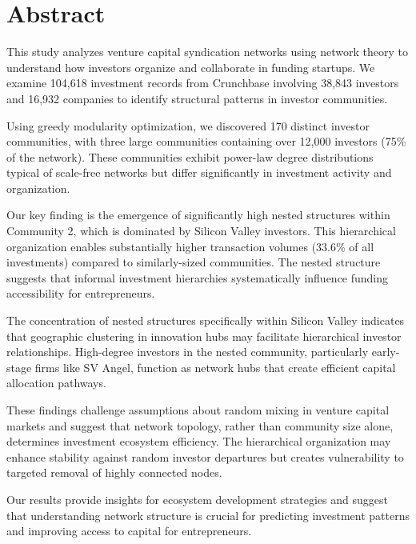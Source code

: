 \section*{Abstract}

This study analyzes venture capital syndication networks using network theory to understand how investors organize and collaborate in funding startups. We examine 104,618 investment records from Crunchbase involving 38,843 investors and 16,932 companies to identify structural patterns in investor communities.

Using greedy modularity optimization, we discovered 170 distinct investor communities, with three large communities containing over 12,000 investors (75\% of the network). These communities exhibit power-law degree distributions typical of scale-free networks but differ significantly in investment activity and organization.

Our key finding is the emergence of significantly high nested structures within Community 2, which is dominated by Silicon Valley investors. This hierarchical organization enables substantially higher transaction volumes (33.6\% of all investments) compared to similarly-sized communities. The nested structure suggests that informal investment hierarchies systematically influence funding accessibility for entrepreneurs.


The concentration of nested structures specifically within Silicon Valley indicates that geographic clustering in innovation hubs may facilitate hierarchical investor relationships. High-degree investors in the nested community, particularly early-stage firms like SV Angel, function as network hubs that create efficient capital allocation pathways.

These findings challenge assumptions about random mixing in venture capital markets and suggest that network topology, rather than community size alone, determines investment ecosystem efficiency. The hierarchical organization may enhance stability against random investor departures but creates vulnerability to targeted removal of highly connected nodes.

Our results provide insights for ecosystem development strategies and suggest that understanding network structure is crucial for predicting investment patterns and improving access to capital for entrepreneurs.
